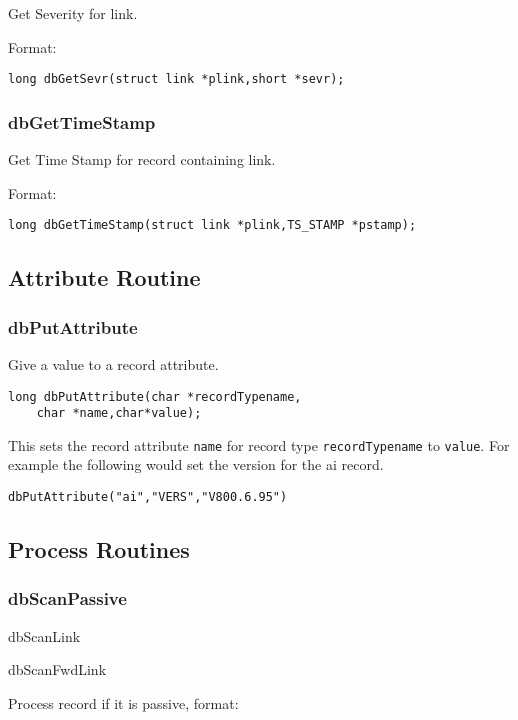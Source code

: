 Get Severity for link.

Format:

\begin{verbatim}long dbGetSevr(struct link *plink,short *sevr);
\end{verbatim}\subsubsection{dbGetTimeStamp}

Get Time Stamp for record containing link.

Format:

\begin{verbatim}long dbGetTimeStamp(struct link *plink,TS_STAMP *pstamp);
\end{verbatim}\subsection{Attribute Routine}

\subsubsection{dbPutAttribute}

Give a value to a record attribute.

\begin{verbatim}long dbPutAttribute(char *recordTypename,
    char *name,char*value);
\end{verbatim}This sets the record attribute \verb|name| for record type \verb|recordTypename| to \verb|value|. For example the following would set 
the version for the ai record.

\begin{verbatim}dbPutAttribute("ai","VERS","V800.6.95")
\end{verbatim}\subsection{Process Routines}

\subsubsection{dbScanPassive}

dbScanLink

dbScanFwdLink

Process record if it is passive, format:

